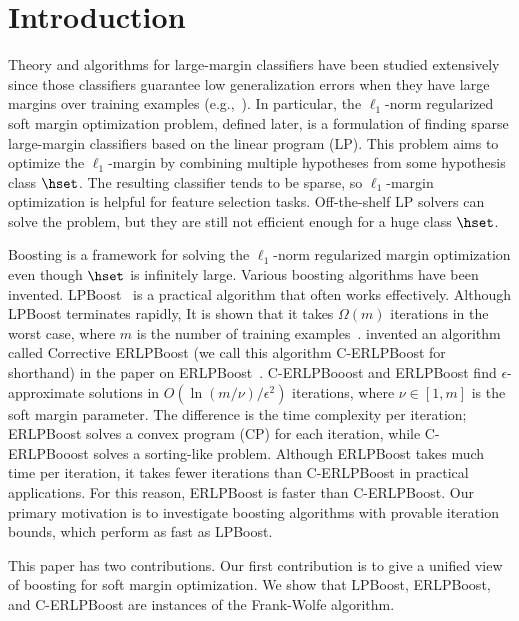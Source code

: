 \section{Introduction}
\label{sec:introduction}
Theory and algorithms for large-margin classifiers 
have been studied extensively 
since those classifiers guarantee low generalization errors 
when they have large margins over training examples 
(e.g.,~\cite{schapire+:as98,mohri+:mitpress18}). 
In particular, 
the $\ell_1$-norm regularized soft margin optimization problem, 
defined later, is a formulation of 
finding sparse large-margin classifiers based on the linear program (LP). 
This problem aims to optimize the $\ell_1$-margin 
by combining multiple hypotheses from some hypothesis class $\hset$. 
The resulting classifier tends to be sparse, 
so $\ell_1$-margin optimization is helpful for feature selection tasks.
Off-the-shelf LP solvers can solve the problem, 
but they are still not efficient enough for a huge class $\hset$. 

Boosting is a framework 
for solving the $\ell_1$-norm regularized margin optimization 
even though $\hset$ is infinitely large. 
Various boosting algorithms have been invented. 
LPBoost~\citep{demiriz+:ml02} is a practical algorithm 
that often works effectively. 
Although LPBoost terminates rapidly, 
It is shown that 
it takes $\Omega(m)$ iterations in the worst case, 
where $m$ is the number of training examples~\citep{warmuth+:nips07}. 
\cite{shalev-shwartz+:jml10} invented
an algorithm
called Corrective ERLPBoost 
(we call this algorithm C-ERLPBoost for shorthand) 
in the paper on ERLPBoost~\citep{warmuth+:alt08}. 
C-ERLPBooost and ERLPBoost 
find $\epsilon$-approximate solutions 
in $O(\ln(m/\nu) / \epsilon^2)$ iterations, 
where $\nu \in [1, m]$ is the soft margin parameter. 
The difference is the time complexity per iteration; 
ERLPBoost solves a convex program (CP) for each iteration, 
while C-ERLPBooost solves a sorting-like problem. 
Although ERLPBoost takes much time per iteration, 
it takes fewer iterations than C-ERLPBoost 
in practical applications. 
For this reason, 
ERLPBoost is faster than C-ERLPBoost. 
Our primary motivation is to investigate boosting algorithms 
with provable iteration bounds, which perform as fast as LPBoost.

This paper has two contributions. 
Our first contribution is to give 
a unified view of boosting for soft margin optimization. 
We show that LPBoost, ERLPBoost, and C-ERLPBoost are 
instances of the Frank-Wolfe algorithm. 


